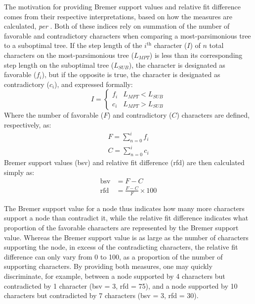 \documentclass[fleqn,10pt,lineno]{wlpeerj} %
\begin{document}
		The motivation for providing Bremer support values and relative fit difference comes from their respective interpretations, based on how the measures are calculated, \textit{per} \citet{goloboff2001}.
		Both of these indices rely on summation of the number of favorable and contradictory characters when comparing a most-parsimonious tree to a suboptimal tree. 
		If the step length of the $i^{\text{th}}$ character ($I$) of $n$ total characters on the most-parsimonious tree ($L_{MPT}$) is less than its corresponding step length on the suboptimal tree ($L_{SUB}$), the character is designated as favorable ($f_{i}$), but if the opposite is true, the character is designated as contradictory ($c_{i}$), and expressed formally:
		\begin{equation}
		I = 
			\begin{cases}
				f_{i} & L_{MPT} < L_{SUB}\\
				c_{i} & L_{MPT} > L_{SUB}
			\end{cases}
		\end{equation}
		Where the number of favorable ($F$) and contradictory ($C$) characters are defined, respectively, as:
		\begin{align}
			F = \sum_{n = 0}^{i}{f_{i}}\\
			C = \sum_{n = 0}^{i}{c_{i}}
		\end{align}
		Bremer support values (bsv) and relative fit difference (rfd) are then calculated simply as:
		\begin{align}
			\text{bsv} & = F - C\\
			\text{rfd} & = \frac{F - C}{F} \times 100
		\end{align}
		
		The Bremer support value for a node thus indicates how many more characters support a node than contradict it, while the relative fit difference indicates what proportion of the favorable characters are represented by the Bremer support value.
		Whereas the Bremer support value is as large as the number of characters supporting the node, in excess of the contradicting characters, the relative fit difference can only vary from 0 to 100, as a proportion of the number of supporting characters.
		By providing both measures, one may quickly discriminate, for example, between a node supported by 4 characters but contradicted by 1 character (bsv = 3, rfd = 75), and a node supported by 10 characters but contradicted by 7 characters (bsv = 3, rfd = 30).
	
\end{document}
